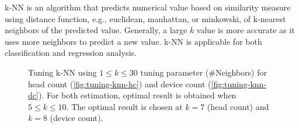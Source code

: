 	\ac{k-NN} is an algorithm that predicts numerical value based on similarity measure using distance function, e.g., euclidean, manhattan, or minkowski, of k-nearest neighbors of the predicted value. Generally, a large $k$ value is more accurate as it uses more neighbors to predict a new value. \ac{k-NN} is applicable for both classification and regression analysis.

	\begin{figure}[h]
		\begin{adjustwidth}{-1cm}{}
		\centering
		\end{adjustwidth}
		\caption{Tuning \ac{k-NN} using $1 \le k \le 30$ tuning parameter (\#Neighbors) for head count (\ref{fig:tuning-knn-hc}) and device count (\ref{fig:tuning-knn-dc}). For both estimation, optimal result is obtained when $5 \le k \le 10$. The optimal result is chosen at $k=7$ (head count) and $k=8$ (device count).}
		\label{fig:tuning-knn}
	\end{figure}

